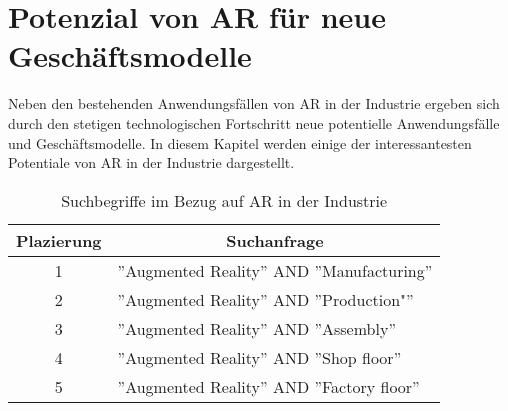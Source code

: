 \section{Potenzial von AR für neue Geschäftsmodelle}

Neben den bestehenden Anwendungsfällen von AR in der Industrie ergeben sich
durch den stetigen technologischen Fortschritt neue potentielle Anwendungsfälle
und Geschäftsmodelle. In diesem Kapitel werden einige der interessantesten
Potentiale von AR in der Industrie dargestellt.

\begin{table}[h]
    \centering
    \captionsetup{font=small}
    \label{tab:tabelle1}
    \renewcommand{\arraystretch}{1.35} %

    \begin{tabular}{c|l}
        \multicolumn{1}{c|}{Plazierung} & \multicolumn{1}{c}{\centering Suchanfrage}  \\
        \hline
        1                               & ''Augmented Reality'' AND ''Manufacturing'' \\
        2                               & ''Augmented Reality'' AND ''Production"''   \\
        3                               & ''Augmented Reality'' AND ''Assembly''      \\
        4                               & ''Augmented Reality'' AND ''Shop floor''    \\
        5                               & ''Augmented Reality'' AND ''Factory floor'' \\
        \hline

    \end{tabular}
    \caption{Suchbegriffe im Bezug auf AR in der Industrie \cite{de2018augmented}}

\end{table}

